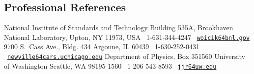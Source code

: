 \documentclass[11pt]{moderncv}
\begin{document}
\subsection{Professional References}
%
{National Institute of Standards and Technology\newline
  Building 535A, Brookhaven National Laboratory, Upton, NY 11973, USA\newline
  \phonesymbol\ 1-631-344-4247\quad
  \emailsymbol\ \href{mailto:woicik@bnl.gov}{\footnotesize\texttt{woicik\char64bnl.gov}}}
%
{9700 S.\ Cass Ave., Bldg. 434\newline
Argonne, IL 60439\newline
\phonesymbol\ 1-630-252-0431\quad
\emailsymbol\ \href{mailto:newville@cars.uchicago.edu}{\footnotesize\texttt{newville\char64cars.uchicago.edu}}}
%
{Department of Physics, Box 351560\newline
University of Washington\newline
Seattle, WA 98195-1560\newline
\phonesymbol\ 1-206-543-8593\quad
\emailsymbol\ \href{mailto:jjr@uw.edu}{\footnotesize\texttt{jjr\char64uw.edu}}}


\nocite{*}


\end{document}

